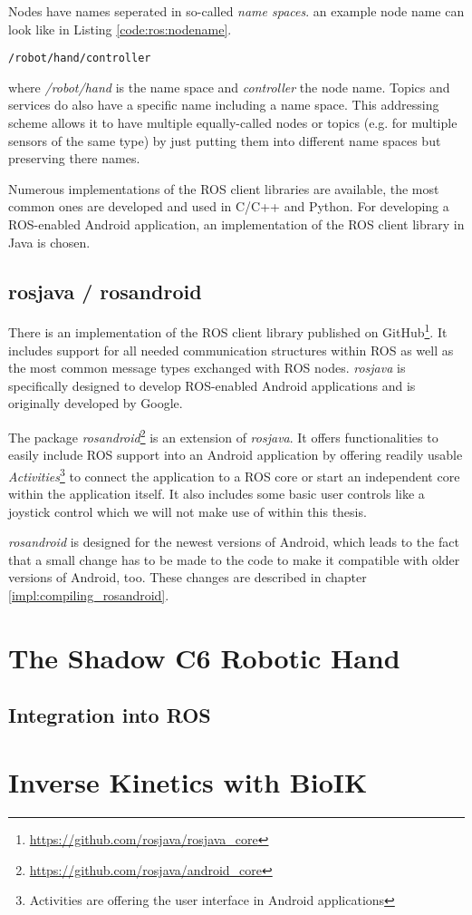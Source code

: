 Nodes have names seperated in so-called \textit{name spaces}. an example node name can look like in Listing \ref{code:ros:nodename}.
\begin{lstlisting}[caption={An example ROS node name},label=code:ros:nodename]
/robot/hand/controller
\end{lstlisting}


where \textit{/robot/hand} is the name space and \textit{controller} the node name. Topics and services do also have a specific name including a name space. This addressing scheme allows it to have multiple equally-called nodes or topics (e.g. for multiple sensors of the same type) by just putting them into different name spaces but preserving there names.

Numerous implementations of the ROS client libraries are available, the most common ones are developed and used in C/C++ and Python\cite{ros:client_libraries}. For developing a ROS-enabled Android application, an implementation of the ROS client library in Java is chosen. 

\subsection{rosjava / rosandroid}

There is an implementation of the ROS client library published on GitHub\footnote{\url{https://github.com/rosjava/rosjava_core}}. It includes support for all needed communication structures within ROS as well as the most common message types exchanged with ROS nodes. \textit{rosjava} is specifically designed to develop ROS-enabled Android applications and is originally developed by Google\cite{ros:rosjava:readme}.

The package \textit{rosandroid}\footnote{\url{https://github.com/rosjava/android_core}} is an extension of \textit{rosjava}. It offers functionalities to easily include ROS support into an Android application by offering readily usable \textit{Activities}\footnote{Activities are offering the user interface in Android applications} to connect the application to a ROS core or start an independent core within the application itself. It also includes some basic user controls like a joystick control which we will not make use of within this thesis.

\textit{rosandroid} is designed for the newest versions of Android, which leads to the fact that a small change has to be made to the code to make it compatible with older versions of Android, too. These changes are described in chapter \ref{impl:compiling_rosandroid}.

\section{The Shadow C6 Robotic Hand}
\subsection{Integration into ROS}

\section{Inverse Kinetics with BioIK}